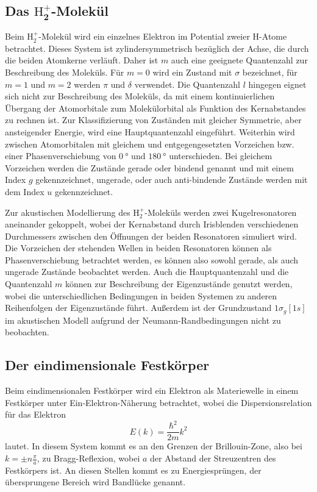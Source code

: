 \subsection[Das $\mathrm{H}_2^{+}$-Molekül]{Das $\symbf{\mathrm{H}_2^{+}}$-Molekül}
Beim $\mathrm{H}_2^{+}$-Molekül wird ein einzelnes Elektron im Potential zweier H-Atome betrachtet. Dieses System ist zylindersymmetrisch bezüglich der Achse, die durch die beiden Atomkerne verläuft. Daher ist $m$ auch eine geeignete Quantenzahl zur Beschreibung des Moleküls. Für $m=0$ wird ein Zustand mit $\sigma$ bezeichnet, für $m=1$ und $m=2$ werden $\pi$ und $\delta$ verwendet. Die Quantenzahl $l$ hingegen eignet sich nicht zur Beschreibung des Moleküls, da mit einem kontinuierlichen Übergang der Atomorbitale zum Molekülorbital als Funktion des Kernabstandes zu rechnen ist. Zur Klassifizierung von Zuständen mit gleicher Symmetrie, aber ansteigender Energie, wird eine Hauptquantenzahl eingeführt.
Weiterhin wird zwischen Atomorbitalen mit gleichem und entgegengesetzten Vorzeichen  bzw. einer Phasenverschiebung von $\SI{0}{\degree}$ und $\SI{180}{\degree}$ unterschieden. Bei gleichem Vorzeichen werden die Zustände gerade oder bindend genannt und mit einem Index $g$ gekennzeichnet, ungerade, oder auch anti-bindende Zustände werden mit dem Index $u$ gekennzeichnet.

Zur akustischen Modellierung des $\mathrm{H}_2^{+}$-Moleküls werden zwei Kugelresonatoren aneinander gekoppelt, wobei der Kernabstand durch Irisblenden verschiedenen Durchmessers zwischen den Öffnungen der beiden Resonatoren simuliert wird. Die Vorzeichen der stehenden Wellen in beiden Resonatoren können als Phasenverschiebung betrachtet werden, es können also sowohl gerade, als auch ungerade Zustände beobachtet werden. Auch die Hauptquantenzahl und die Quantenzahl $m$ können zur Beschreibung der Eigenzustände genutzt werden, wobei die unterschiedlichen Bedingungen in beiden Systemen zu anderen Reihenfolgen der Eigenzustände führt. Außerdem ist der Grundzustand $1\sigma_g [1s]$ im akustischen Modell aufgrund der Neumann-Randbedingungen nicht zu beobachten.

\subsection{Der eindimensionale Festkörper}
Beim eindimensionalen Festkörper wird ein Elektron als Materiewelle in einem Festkörper unter Ein-Elektron-Näherung betrachtet, wobei die Dispersionsrelation für das Elektron
\begin{equation}
  E (k) = \frac{\hbar^2}{2m} k^2
  \label{eq:dispersion_qm}
\end{equation}
lautet. In diesem System kommt es an den Grenzen der Brillouin-Zone, also bei $k = \pm n \frac{\pi}{a}$, zu Bragg-Reflexion, wobei $a$ der Abstand der Streuzentren des Festkörpers ist. An diesen Stellen kommt es zu Energiesprüngen, der übersprungene Bereich wird Bandlücke genannt.

